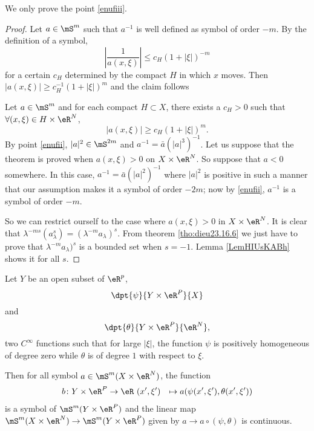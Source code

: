 We only prove the point \ref{enufiii}.

\begin{proof}
Let $a\in\mS^m$ such that $a^{-1}$ is well defined as symbol of order $-m$. By the definition of a symbol,
\begin{equation}
\left| \frac{1}{a(x,\xi)}  \right|\leq c_H(1+|\xi|)^{-m}
\end{equation}
for a certain $c_H$ determined by the compact $H$ in which $x$ moves. Then $|a(x,\xi)|\geq c_H^{-1}(1+|\xi|)^m$ and the claim follows

 Let $a\in\mS^m$ and for each compact $H\subset X$, there exists a $c_H>0$ such that $\forall(x,\xi)\in H\times \eR^N$,
\[
   |a(x,\xi)|\geq c_H(1+|\xi|)^m.
\]
By point \ref{enufii}, $|a|^2\in\mS^{2m}$ and $a^{-1}=\bar a (|a|^3)^{-1}$. Let us suppose that the theorem is proved when $a(x,\xi)>0$ on $X\times\eR^N$. So suppose that $a<0$ somewhere. In this case, $a^{-1}=\bar a(|a|^2)^{-1}$ where $|a|^2$ is positive in such a manner that our assumption makes it a symbol of order $-2m$; now by \ref{enufii}, $a^{-1}$ is a symbol of order $-m$. 

So we can restrict ourself to the case where $a(x,\xi)>0$ in $X\times\eR^N$. It is clear that $\lambda^{-ms}(a_{\lambda}^s)=(\lambda^{-m}a_{\lambda})^s$. From theorem \ref{tho:dieu23.16.6} we just have to prove that 
$\lambda^{-m}a_{\lambda})^s$ is a bounded set when $s=-1$. Lemma \ref{LemHIUsKABh} shows it for all $s$.

\end{proof}

\begin{proposition}
Let $Y$ be an open subset of $\eR^p$,
\[
  \dpt{\psi}{Y\times\eR^P}{X}
\]
and
\[
  \dpt{\theta}{Y\times\eR^P}{\eR^N},
\]
two $C^{\infty}$ functions such that for large $|\xi|$, the function $\psi$ is positively homogeneous of degree zero while $\theta$ is of degree $1$ with respect to $\xi$.

Then for all symbol $a\in\mS^m(X\times\eR^N)$, the function
		\begin{equation}
		\begin{aligned}
			b \colon Y\times\eR^P &\to \eR\
			(x',\xi')&\mapsto a(\psi(x',\xi'),\theta(x',\xi'))
		\end{aligned}
	\end{equation}	
is a symbol of $\mS^m(Y\times\eR^P)$ and the linear map $\mS^m(X\times\eR^N)\to\mS^m(Y\times\eR^P)$ given by $a\to a\circ(\psi,\theta)$ is continuous.


\end{proposition}

